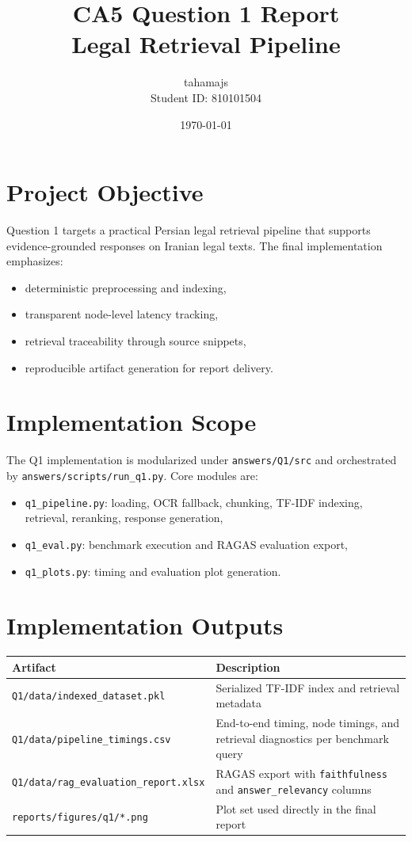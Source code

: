 \documentclass[12pt,a4paper]{article}
\title{CA5 Question 1 Report\\Legal Retrieval Pipeline}
\author{tahamajs\\Student ID: 810101504}
\date{\today}
\begin{document}
\maketitle

\section{Project Objective}
Question 1 targets a practical Persian legal retrieval pipeline that supports evidence-grounded responses on Iranian legal texts. The final implementation emphasizes:
\begin{itemize}
\item deterministic preprocessing and indexing,
\item transparent node-level latency tracking,
\item retrieval traceability through source snippets,
\item reproducible artifact generation for report delivery.
\end{itemize}

\section{Implementation Scope}
The Q1 implementation is modularized under \texttt{answers/Q1/src} and orchestrated by \texttt{answers/scripts/run\_q1.py}. Core modules are:
\begin{itemize}
\item \texttt{q1\_pipeline.py}: loading, OCR fallback, chunking, TF-IDF indexing, retrieval, reranking, response generation,
\item \texttt{q1\_eval.py}: benchmark execution and RAGAS evaluation export,
\item \texttt{q1\_plots.py}: timing and evaluation plot generation.
\end{itemize}

\section{Implementation Outputs}
\begin{longtable}{@{}>{\raggedright\arraybackslash}p{} >{\raggedright\arraybackslash}p{}@{}}
\toprule
Artifact & Description \\
\midrule
\texttt{Q1/data/indexed\_dataset.pkl} & Serialized TF-IDF index and retrieval metadata \\
\texttt{Q1/data/pipeline\_timings.csv} & End-to-end timing, node timings, and retrieval diagnostics per benchmark query \\
\texttt{Q1/data/}\linebreak\texttt{rag\_evaluation\_report.xlsx} & RAGAS export with \texttt{faithfulness} and \texttt{answer\_relevancy} columns \\
\texttt{reports/figures/q1/*.png} & Plot set used directly in the final report \\
\bottomrule
\end{longtable}
\end{document}
